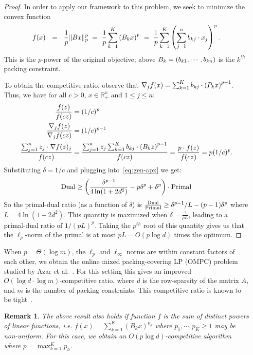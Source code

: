 \documentclass[letterpaper,11pt]{article}
\newtheorem{rem}[thm]{Remark}
\def \RR   {{\mathbb R}}
\begin{document}
\begin{proof}
  In order to apply our framework to this problem, we seek to minimize
  the convex function
  \begin{gather*}
    f(x) ~~=~~ \frac1p \| Bx \|_p^p \,\,=\,\,\frac{1}{p}\sum_{k=1}^{K}\left(B_k
      x\right)^p \,\,=\,\, \frac{1}{p}\sum_{k=1}^{K}\left( \sum_{j=1}^n
      b_{kj}\cdot x_j
    \right)^p .
  \end{gather*}
  This is the $p$-power of the original objective; above
  $B_k=(b_{k1},\cdots,b_{kn})$ is the $k^{th}$ packing constraint.

  To obtain the competitive ratio, observe that $\nabla_j f(x) =
  \sum_{k=1}^K b_{kj}\cdot \left(P_k x\right)^{p-1}$.  Thus, we
  have for all $c>0$, $x\in \RR^n_+$ and $1\leq j \leq n$:
  \begin{align*}
    \frac{f(z)}{f(cz)} & = (1/c)^p \\
    \frac{\nabla_j f(z)}{\nabla_j f(c z)} &= (1/c)^{p-1} \\
    \frac{\sum_{j=1}^{n}z_j \cdot \nabla f(z)_j}{f(cz)} &=
    \frac{\sum_{j=1}^{n}z_j\sum_{k=1}^K b_{kj }\cdot \left(B_k z\right)^{p-1}}{f(cz)}=     \frac{p\cdot f(z)}{f(cz)}  = p(1/c)^{p}.
     \end{align*}
Substituting $\delta = 1/c$ and plugging into~\eqref{eq:gen-apx} we get:
  \begin{equation}
    {\rm Dual} \geq \left(\frac{\delta^{p-1}}{4 \ln(1 + 2d^2)} - p \delta^p +
      \delta^p\right) \cdot {\rm Primal}
  \end{equation}
  So the primal-dual ratio (as a function of $\delta$) is
  $\frac{{\rm Dual}}{{\rm Primal}} \ge \delta^{p-1}/L - (p-1)\delta^p$ where
  $L= 4 \ln(1 + 2d^2)$. This quantity is maximized when $\delta=\frac{1}{pL}$,
  leading to a primal-dual ratio of $1/(pL)^p$. Taking the $p^{th}$ root
  of this quantity gives us that the $\ell_p$-norm of the primal is at
  most $pL = O(p \log d)$ times the optimum.
\end{proof}

When $p=\Theta(\log m)$, the $\ell_p$ and $\ell_\infty$ norms are within
constant factors of each other, we obtain the online mixed
packing-covering LP (OMPC) problem studied by Azar et al.~\cite{ABFP13}.
For this setting this gives an improved $O(\log d\cdot \log
m)$-competitive ratio, where $d$ is the row-sparsity of the matrix $A$,
and $m$ is the number of packing constraints. This competitive ratio is
known to be tight~\cite[Theorem~1.2]{ABFP13}.

\begin{rem}\label{rem:diff-p} The above result also holds if function $f$ is the sum of distinct powers of linear functions, i.e. $f(x) = \sum_{k=1}^K (B_k x)^{p_k}$ where $p_1,\cdots,p_K\ge 1$ may be non-uniform. For this case, we obtain an $O(p\log d)$-competitive algorithm where $p=\max_{k=1}^K p_k$.
\end{rem}
\end{document}
